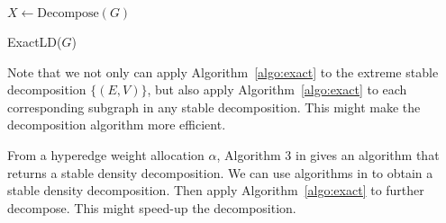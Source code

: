 {\begin{algorithm}\label{algo:exact}
	\SetAlgoLined
	$X \gets \text{Decompose}(G)$\;
	\caption{ExactLD($G$)}
\end{algorithm}

Note that we not only can apply  Algorithm~\ref{algo:exact} to the extreme stable decomposition $\{(E, V)\}$, but also apply Algorithm~\ref{algo:exact} to each corresponding subgraph in any stable decomposition. This might make the decomposition algorithm more efficient. 



From a hyperedge weight allocation $\alpha$, Algorithm 3 in \cite{DBLP:conf/www/DanischCS17} gives an algorithm that returns a stable density decomposition. We can use algorithms in \cite{DBLP:conf/www/DanischCS17} to obtain a stable density decomposition. Then apply Algorithm~\ref{algo:exact} to further decompose. This might speed-up the decomposition. 


%
\ignore{







}}

